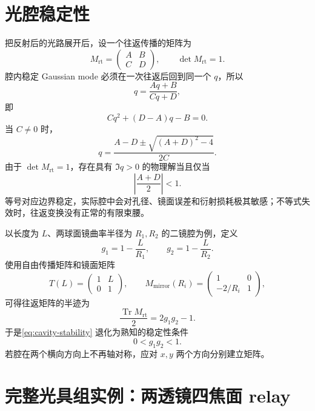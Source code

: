 \section{光腔稳定性}

把反射后的光路展开后，设一个往返传播的矩阵为
\begin{equation}
	M_{\mathrm{rt}}=
	\begin{pmatrix}
	A&B\\C&D
	\end{pmatrix},
\qquad
\det M_{\mathrm{rt}}=1.
\end{equation}
腔内稳定 Gaussian mode 必须在一次往返后回到同一个 \(q\)，所以
\begin{equation}
	q=\frac{Aq+B}{Cq+D},
\end{equation}
即
\begin{equation}
	Cq^2+(D-A)q-B=0.
\end{equation}
当 \(C\neq0\) 时，
\begin{equation}
	q=\frac{A-D\pm\sqrt{(A+D)^2-4}}{2C}.
\end{equation}
由于 \(\det M_{\mathrm{rt}}=1\)，存在具有 \(\Im q>0\) 的物理解当且仅当
\begin{equation}
	\left|\frac{A+D}{2}\right|<1.
\label{eq:cavity-stability}
\end{equation}
等号对应边界稳定，实际腔中会对孔径、镜面误差和衍射损耗极其敏感；不等式失效时，往返变换没有正常的有限束腰。

以长度为 \(L\)、两球面镜曲率半径为 \(R_1,R_2\) 的二镜腔为例，定义
\begin{equation}
	g_1=1-\frac{L}{R_1},\qquad
	g_2=1-\frac{L}{R_2}.
\end{equation}
使用自由传播矩阵和镜面矩阵
\[
	T(L)=\begin{pmatrix}1&L\\0&1\end{pmatrix},
\qquad
	M_{\mathrm{mirror}}(R_i)=
	\begin{pmatrix}1&0\\-2/R_i&1\end{pmatrix},
\]
可得往返矩阵的半迹为
\begin{equation}
	\frac{\operatorname{Tr}M_{\mathrm{rt}}}{2}=2g_1g_2-1.
\end{equation}
于是\cref{eq:cavity-stability} 退化为熟知的稳定性条件
\begin{equation}
	0<g_1g_2<1.
\end{equation}
若腔在两个横向方向上不再轴对称，应对 \(x,y\) 两个方向分别建立矩阵。

\section{完整光具组实例：两透镜四焦面 relay}


